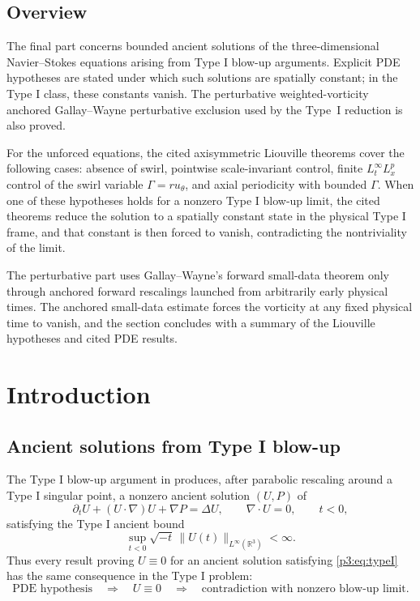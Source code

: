 \documentclass[11pt]{amsart}
\theoremstyle{plain}
\theoremstyle{definition}
\theoremstyle{remark}
\numberwithin{equation}{section}
\begin{document}
\subsection*{Overview}

The final part concerns bounded ancient solutions of the three-dimensional
Navier--Stokes equations arising from Type I blow-up arguments.  Explicit PDE
hypotheses are stated under which such solutions are spatially constant; in the
Type I class, these constants vanish.  The perturbative weighted-vorticity
anchored Gallay--Wayne perturbative exclusion used by the Type~I
reduction is also proved.

For the unforced equations, the cited axisymmetric Liouville theorems cover the
following cases: absence of swirl, pointwise scale-invariant control, finite
\(L_t^\infty L_x^p\) control of the swirl variable \(\Gamma=ru_\theta\), and
axial periodicity with bounded \(\Gamma\).  When one of these hypotheses holds
for a nonzero Type I blow-up limit, the cited theorems reduce the solution to a
spatially constant state in the physical Type I frame, and that constant is
then forced to vanish, contradicting the nontriviality of the limit.

The perturbative part uses Gallay--Wayne's forward small-data theorem only
through anchored forward rescalings launched from arbitrarily early physical
times.  The anchored small-data estimate forces the vorticity at any fixed
physical time to vanish, and the section concludes with a summary of the
Liouville hypotheses and cited PDE results.

\section{Introduction}

\subsection{Ancient solutions from Type I blow-up}

The Type I blow-up argument in  produces, after
parabolic rescaling around a Type I singular point, a nonzero ancient solution
\((U,P)\) of
\begin{equation}\label{p3:eq:NS}
   \partial_tU+(U\cdot\nabla)U+\nabla P=\Delta U,
   \qquad \nabla\cdot U=0,
   \qquad t<0,
\end{equation}
satisfying the Type I ancient bound
\begin{equation}\label{p3:eq:typeI}
   \sup_{t<0}\sqrt{-t}\,
   \|U(t)\|_{L^\infty(\mathbb R^3)}<\infty .
\end{equation}
Thus every result proving \(U\equiv0\) for an ancient solution satisfying
\eqref{p3:eq:typeI} has the same consequence in the Type I problem:
\[
   \text{PDE hypothesis}
   \quad\Longrightarrow\quad
   U\equiv0
   \quad\Longrightarrow\quad
   \text{contradiction with nonzero blow-up limit}.
\]
\end{document}
